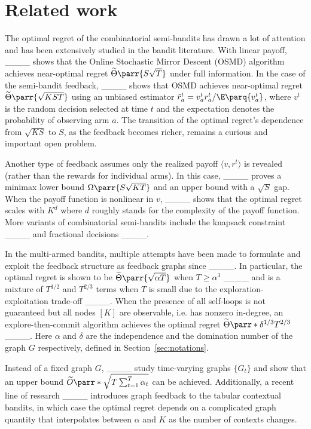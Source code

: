\section{Related work}
The optimal regret of the combinatorial semi-bandits has drawn a lot of attention and has been extensively studied in the bandit literature. With linear payoff, ____ shows that the Online Stochastic Mirror Descent (OSMD) algorithm achieves near-optimal regret $\widetilde\Theta\parr{S\sqrt{T}}$ under full information. In the case of the semi-bandit feedback, ____ shows that OSMD achieves near-optimal regret $\widetilde\Theta\parr{\sqrt{KST}}$ using an unbiased estimator $\Tilde{r}^t_a = v^t_ar^t_a / \E\parq{v^t_a}$, where $v^t$ is the random decision selected at time $t$ and the expectation denotes the probability of observing arm $a$. The transition of the optimal regret's dependence from $\sqrt{KS}$ to $S$, as the feedback becomes richer, remains a curious and important open problem. 

Another type of feedback assumes only the realized payoff $\langle v, r^t\rangle$ is revealed (rather than the rewards for individual arms). In this case, ____ proves a minimax lower bound $\Omega\parr{S\sqrt{KT}}$ and an upper bound with a $\sqrt{S}$ gap. When the payoff function is nonlinear in $v$, ____ shows that the optimal regret scales with $K^d$ where $d$ roughly stands for the complexity of the payoff function. More variants of combinatorial semi-bandits include the knapsack constraint ____ and fractional decisions ____.

In the multi-armed bandits, multiple attempts have been made to formulate and exploit the feedback structure as feedback graphs since ____. In particular, the optimal regret is shown to be $\widetilde\Theta\parr{\sqrt{\alpha T}}$ when $T\geq \alpha^3$ ____ and is a mixture of $T^{1/2}$ and $T^{2/3}$ terms when $T$ is small due to the exploration-exploitation trade-off ____. When the presence of all self-loops is not guaranteed but all nodes $[K]$ are observable, i.e. has nonzero in-degree, an explore-then-commit algorithm achieves the optimal regret $\widetilde\Theta\parr*{\delta^{1/3}T^{2/3}}$ ____. Here $\alpha$ and $\delta$ are the independence and the domination number of the graph $G$ respectively, defined in Section~\ref{sec:notations}. 

Instead of a fixed graph $G$, ____ study time-varying graphs $\{G_t\}$ and show that an upper bound $\widetilde{O}\parr*{\sqrt{T\sum_{t=1}^T\alpha_t}}$ can be achieved. Additionally, a recent line of research ____ introduces graph feedback to the tabular contextual bandits, in which case the optimal regret depends on a complicated graph quantity that interpolates between $\alpha$ and $K$ as the number of contexts changes.